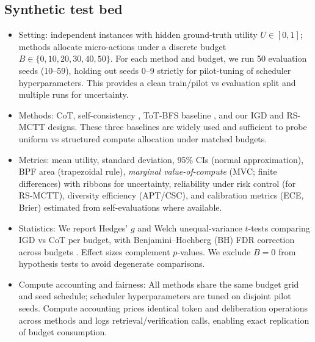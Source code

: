 \subsection{Synthetic test bed}
\begin{itemize}[leftmargin=1.6em, itemsep=0.2em]
\item Setting: independent instances with hidden ground-truth utility $U\in[0,1]$; methods allocate micro-actions under a discrete budget $B\in\{0,10,20,30,40,50\}$. For each method and budget, we run 50 evaluation seeds (10--59), holding out seeds 0--9 strictly for pilot-tuning of scheduler hyperparameters. This provides a clean train/pilot vs evaluation split and multiple runs for uncertainty.
\item Methods: CoT, self-consistency \cite{wang2023selfconsistency}, ToT-BFS baseline \cite{yao2023tot}, and our IGD and RS-MCTT designs. These three baselines are widely used and sufficient to probe uniform vs structured compute allocation under matched budgets.
\item Metrics: mean utility, standard deviation, 95\% CIs (normal approximation), BPF area (trapezoidal rule), \emph{marginal value-of-compute} (MVC; finite differences) with ribbons for uncertainty, reliability under risk control (for RS-MCTT), diversity efficiency (APT/CSC), and calibration metrics (ECE, Brier) estimated from self-evaluations where available.
\item Statistics: We report Hedges’ $g$ and Welch unequal-variance $t$-tests \cite{welch1947,hedges1981} comparing IGD vs CoT per budget, with Benjamini–Hochberg (BH) FDR correction across budgets \cite{benjamini1995fdr}. Effect sizes complement $p$-values. We exclude $B{=}0$ from hypothesis tests to avoid degenerate comparisons.
\item Compute accounting and fairness: All methods share the same budget grid and seed schedule; scheduler hyperparameters are tuned on disjoint pilot seeds. Compute accounting prices identical token and deliberation operations across methods and logs retrieval/verification calls, enabling exact replication of budget consumption.
\end{itemize}

